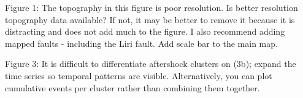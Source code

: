 \documentclass[10pt]{extarticle}
\begin{document}
\begin{Answer}
 \WorkInProgressRevTask
\end{Answer}
%
%




\begin{ReviewerComment}{2}
\noindent 
Figure 1: The topography in this figure is poor resolution. Is better resolution topography data available? If not, it may be better to remove it because it is distracting and does not add much to the figure. I also recommend adding mapped faults - including the Liri fault. Add scale bar to the main map.

\end{ReviewerComment}


\begin{Answer}
 \WorkInProgressRevTask
\end{Answer}
%
%



\begin{ReviewerComment}{2}
\noindent 
Figure 3: It is difficult to differentiate aftershock clusters on (3b); expand the time series so temporal patterns are visible. Alternatively, you can plot cumulative events per cluster rather than combining them together.  

\end{ReviewerComment}
\end{document}
